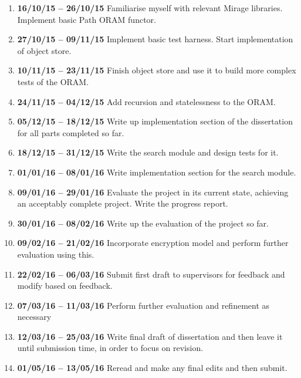 \documentclass[12pt,a4paper,twoside]{article}
\begin{document}
\begin{enumerate}

\item {\bf 16/10/15 -- 26/10/15} Familiarise myself with relevant Mirage libraries. Implement basic Path ORAM functor.

\item {\bf 27/10/15 -- 09/11/15} Implement basic test harness. Start implementation of object store.

\item {\bf 10/11/15 -- 23/11/15} Finish object store and use it to build more complex tests of the ORAM.

\item {\bf 24/11/15 -- 04/12/15} Add recursion and statelessness to the ORAM.

\item {\bf 05/12/15 -- 18/12/15} Write up implementation section of the dissertation for all parts completed so far.

\item {\bf 18/12/15 -- 31/12/15} Write the search module and design tests for it.

\item {\bf 01/01/16 -- 08/01/16} Write implementation section for the search module.

\item {\bf 09/01/16 -- 29/01/16} Evaluate the project in its current state, achieving an acceptably complete project. Write the progress report.

\item {\bf 30/01/16 -- 08/02/16} Write up the evaluation of the project so far.

\item {\bf 09/02/16 -- 21/02/16} Incorporate encryption model and perform further evaluation using this.

\item {\bf 22/02/16 -- 06/03/16} Submit first draft to supervisors for feedback and modify based on feedback.

\item {\bf 07/03/16 -- 11/03/16} Perform further evaluation and refinement as necessary

\item {\bf 12/03/16 -- 25/03/16} Write final draft of dissertation and then leave it until submission time, in order to focus on revision.

\item {\bf 01/05/16 -- 13/05/16} Reread and make any final edits and then submit.

\end{enumerate}
\end{document}
